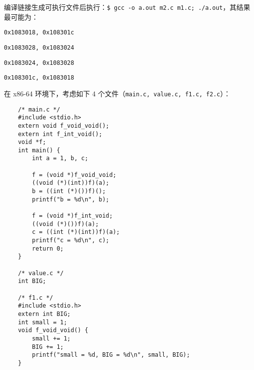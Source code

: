 \begin{problems}
        编译链接生成可执行文件后执行：\verb|$ gcc -o a.out m2.c m1.c; ./a.out|，其结果最可能为：
        \begin{choices}
            \item \verb|0x1083018, 0x108301c|
            \item \verb|0x1083028, 0x1083024|
            \item \verb|0x1083024, 0x1083028|
            \item \verb|0x108301c, 0x1083018|
        \end{choices}
         在 x86-64 环境下，考虑如下 4 个文件（\verb|main.c, value.c, f1.c, f2.c|）：
        \begin{verbatim}
    /* main.c */
    #include <stdio.h>
    extern void f_void_void();
    extern int f_int_void();
    void *f;
    int main() {
        int a = 1, b, c;

        f = (void *)f_void_void;
        ((void (*)(int))f)(a);
        b = ((int (*)())f)();
        printf("b = %d\n", b);

        f = (void *)f_int_void;
        ((void (*)())f)(a);
        c = ((int (*)(int))f)(a);
        printf("c = %d\n", c);
        return 0;
    }

    /* value.c */
    int BIG;

    /* f1.c */
    #include <stdio.h>
    extern int BIG;
    int small = 1;
    void f_void_void() {
        small += 1;
        BIG += 1;
        printf("small = %d, BIG = %d\n", small, BIG);
    }


\end{verbatim}
\end{problems}
